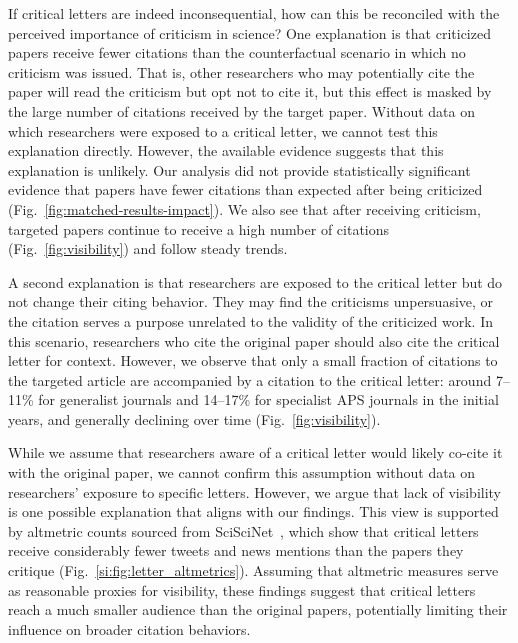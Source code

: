 \documentclass[12pt,a4paper]{article}
\numberwithin{equation}{section}
\begin{document}
If critical letters are indeed inconsequential, how can this be reconciled with the perceived importance of criticism in science?
One explanation is that criticized papers receive fewer citations than the counterfactual scenario in which no criticism was issued.
That is, other researchers who may potentially cite the paper will read the criticism but opt not to cite it, but this effect is masked by the large number of citations received by the target paper. 
Without data on which researchers were exposed to a critical letter, we cannot test this explanation directly. 
However, the available evidence suggests that this explanation is unlikely.
Our analysis did not provide statistically significant evidence that papers have fewer citations than expected after being criticized (Fig.~\ref*{fig:matched-results-impact}). 
We also see that after receiving criticism, targeted papers continue to receive a high number of citations (Fig.~\ref*{fig:visibility}) and follow steady trends.

A second explanation is that researchers are exposed to the critical letter but do not change their citing behavior.
They may find the criticisms unpersuasive, or the citation serves a purpose unrelated to the validity of the criticized work.
In this scenario, researchers who cite the original paper should also cite the critical letter for context.
However, we observe that only a small fraction of citations to the targeted article are accompanied by a citation to the critical letter: around 7--11\% for generalist journals and 14--17\% for specialist APS journals in the initial years, and generally declining over time (Fig.~\ref*{fig:visibility}).

While we assume that researchers aware of a critical letter would likely co-cite it with the original paper, we cannot confirm this assumption without data on researchers' exposure to specific letters.
However, we argue that lack of visibility is one possible explanation that aligns with our findings. 
This view is supported by altmetric counts sourced from SciSciNet~\cite{lin_2023_sciscinet}, which show that critical letters receive considerably fewer tweets and news mentions than the papers they critique (Fig.~\ref*{si:fig:letter_altmetrics}).
Assuming that altmetric measures serve as reasonable proxies for visibility, these findings suggest that critical letters reach a much smaller audience than the original papers, potentially limiting their influence on broader citation behaviors.
\end{document}
